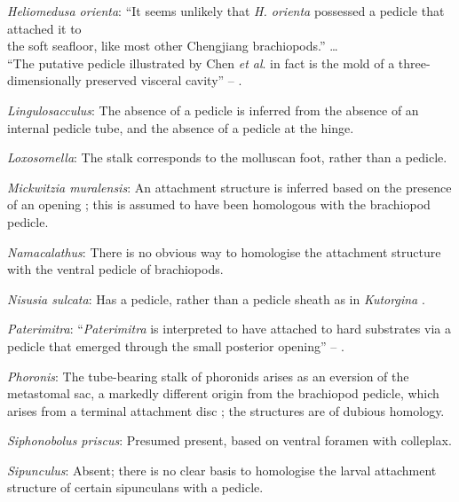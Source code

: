 \documentclass[openany]{book}
\theoremstyle{definition}
\theoremstyle{definition}
\theoremstyle{definition}
\theoremstyle{remark}
\begin{document}
\hypertarget{Heliomedusa_orienta-coding-15}{}
\emph{Heliomedusa orienta}: ``It seems unlikely that \emph{H. orienta}
possessed a pedicle that attached it to\\
the soft seafloor, like most other Chengjiang brachiopods.'' \ldots{}\\
``The putative pedicle illustrated by Chen \emph{et al}.
\citeyearpar[Figs 4, 6, 7]{Chen2007Reinterpretationof} in fact is the
mold of a three-dimensionally preserved visceral cavity'' --
\citet{Zhang2009Architectureand}.

\hypertarget{Lingulosacculus-coding-15}{}
\emph{Lingulosacculus}: The absence of a pedicle is inferred from the
absence of an internal pedicle tube, and the absence of a pedicle at the
hinge.

\hypertarget{Loxosomella-coding-15}{}
\emph{Loxosomella}: The stalk corresponds to the molluscan foot, rather
than a pedicle.

\hypertarget{Mickwitzia_muralensis-coding-15}{}
\emph{Mickwitzia muralensis}: An attachment structure is inferred based
on the presence of an opening \citep{Balthasar2004Shellstructure}; this
is assumed to have been homologous with the brachiopod pedicle.

\hypertarget{Namacalathus-coding-15}{}
\emph{Namacalathus}: There is no obvious way to homologise the
attachment structure with the ventral pedicle of brachiopods.

\hypertarget{Nisusia_sulcata-coding-15}{}
\emph{Nisusia sulcata}: Has a pedicle, rather than a pedicle sheath as
in \emph{Kutorgina}
\citep{Holmer2018Evolutionarysignificance, Holmer2018Theattachment}.

\hypertarget{Paterimitra-coding-15}{}
\emph{Paterimitra}: ``\emph{Paterimitra} is interpreted to have attached
to hard substrates via a pedicle that emerged through the small
posterior opening'' -- \citet{Skovsted2009Thescleritome}.

\hypertarget{Phoronis-coding-15}{}
\emph{Phoronis}: The tube-bearing stalk of phoronids arises as an
eversion of the metastomal sac, a markedly different origin from the
brachiopod pedicle, which arises from a terminal attachment disc
\citep{Young2002}; the structures are of dubious homology.

\hypertarget{Siphonobolus_priscus-coding-15}{}
\emph{Siphonobolus priscus}: Presumed present, based on ventral foramen
with colleplax.

\hypertarget{Sipunculus-coding-15}{}
\emph{Sipunculus}: Absent; there is no clear basis to homologise the
larval attachment structure of certain sipunculans with a pedicle.
\end{document}
